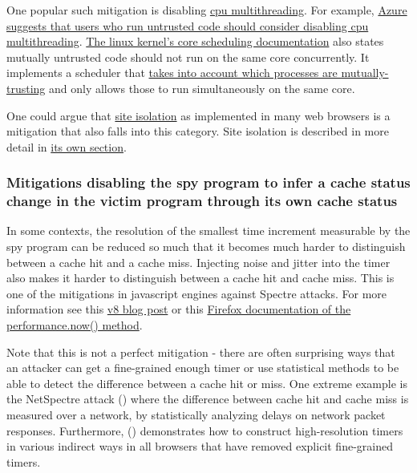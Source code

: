 \documentclass[
  a4paper,
]{report}
\begin{document}
One popular such mitigation is disabling
\href{https://en.wikipedia.org/wiki/Multithreading_(computer_architecture)}{\label{__index_entry_137}{cpu
multithreading}}. For example,
\href{https://learn.microsoft.com/en-us/azure/virtual-machines/mitigate-se}{Azure
suggests that users who run untrusted code should consider disabling cpu
multithreading}.
\href{https://www.kernel.org/doc/Documentation/admin-guide/hw-vuln/core-scheduling.rst}{The
linux kernel's core scheduling documentation} also states mutually
untrusted code should not run on the same core concurrently. It
implements a scheduler that
\href{https://lwn.net/Articles/861251/}{takes into account which
processes are mutually-trusting} and only allows those to run
simultaneously on the same core.

One could argue that
\href{https://developer.chrome.com/blog/site-isolation/}{\label{__index_entry_138}{site
isolation}} as implemented in many web browsers is
a mitigation that also falls into this category. Site isolation is
described in more detail in \hyperref[site-isolation]{its own section}.

\subsubsection{Mitigations disabling the spy program to infer a cache
status change in the victim program through its own cache
status}\label{mitigations-disabling-the-spy-program-to-infer-a-cache-status-change-in-the-victim-program-through-its-own-cache-status}

In some contexts, the resolution of the smallest time increment
measurable by the spy program can be reduced so much that it becomes
much harder to distinguish between a cache hit and a cache miss.
Injecting noise and jitter into the timer also makes it harder to
distinguish between a cache hit and cache miss. This is one of the
mitigations in javascript engines against Spectre attacks. For more
information see this \href{https://v8.dev/blog/spectre}{v8 blog post} or
this
\href{https://developer.mozilla.org/en-US/docs/Web/API/Performance/now}{Firefox
documentation of the performance.now()
method}\label{__index_entry_139}{}.

Note that this is not a perfect mitigation - there are often surprising
ways that an attacker can get a fine-grained enough timer or use
statistical methods to be able to detect the difference between a cache
hit or miss. One extreme example is the
\label{__index_entry_140}{NetSpectre}
attack () where the
difference between cache hit and cache miss is measured over a network,
by statistically analyzing delays on network packet responses.
Furthermore, ()
demonstrates how to construct high-resolution timers in various indirect
ways in all browsers that have removed explicit fine-grained timers.
\end{document}
